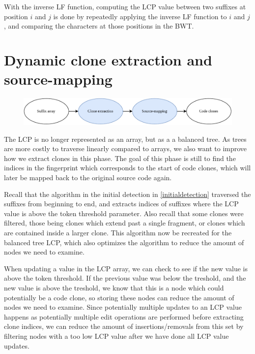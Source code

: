With the inverse LF function, computing the LCP value between two suffixes at position $i$
and $j$ is done by repeatedly applying the inverse LF function to $i$ and $j$, and
comparing the characters at those positions in the BWT.



\section{Dynamic clone extraction and source-mapping}


\begin{figure}[H]
    \begin{center}
        \includegraphics[width=1\textwidth]{figures/phases/phases_extractionandsourcemap.drawio.pdf}
    \end{center}
\end{figure}

The LCP is no longer represented as an array, but as a a balanced tree. As trees are more
costly to traverse linearly compared to arrays, we also want to improve how we extract
clones in this phase. The goal of this phase is still to find the indices in the
fingerprint which corresponds to the start of code clones, which will later be mapped back
to the original source code again.

Recall that the algorithm in the initial detection in \cref{initialdetection} traversed
the suffixes from beginning to end, and extracts indices of suffixes where the LCP value
is above the token threshold parameter. Also recall that some clones were filtered, those
being clones which extend past a single fragment, or clones which are contained inside a
larger clone. This algorithm now be recreated for the balanced tree LCP, which also
optimizes the algorithm to reduce the amount of nodes we need to examine.

When updating a value in the LCP array, we can check to see if the new value is above the
token threshold. If the previous value was below the treshold, and the new value is above
the treshold, we know that this is a node which could potentially be a code clone, so
storing these nodes can reduce the amount of nodes we need to examine. Since potentially
multiple updates to an LCP value happens as potentially multiple edit operations are
performed before extracting clone indices, we can reduce the amount of insertions/removals
from this set by filtering nodes with a too low LCP value after we have done all LCP value
updates.

